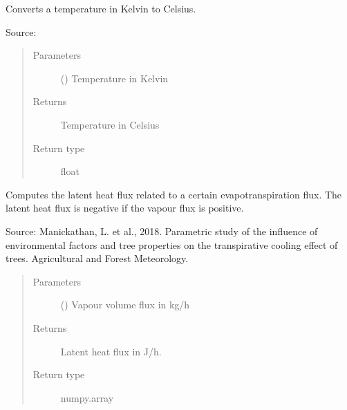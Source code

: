\documentclass[letterpaper,10pt,english]{sphinxmanual}
\begin{document}

\begin{fulllineitems}
\label{\detokenize{air:livestock.air.kelvin_to_celsius}}
Converts a temperature in Kelvin to Celsius.

Source: 
\begin{quote}\begin{description}
\item[{Parameters}] \leavevmode
{} () \textendash{} Temperature in Kelvin

\item[{Returns}] \leavevmode
Temperature in Celsius

\item[{Return type}] \leavevmode
float

\end{description}\end{quote}

\end{fulllineitems}


\begin{fulllineitems}
\label{\detokenize{air:livestock.air.latent_heat_flux}}
Computes the latent heat flux related to a certain evapotranspiration flux.
The latent heat flux is negative if the vapour flux is positive.

Source: Manickathan, L. et al., 2018.
Parametric study of the influence of environmental factors and tree properties on the
transpirative cooling effect of trees. Agricultural and Forest Meteorology.
\begin{quote}\begin{description}
\item[{Parameters}] \leavevmode
{} () \textendash{} Vapour volume flux in kg/h

\item[{Returns}] \leavevmode
Latent heat flux in J/h.

\item[{Return type}] \leavevmode
numpy.array

\end{description}\end{quote}

\end{fulllineitems}
\end{document}
